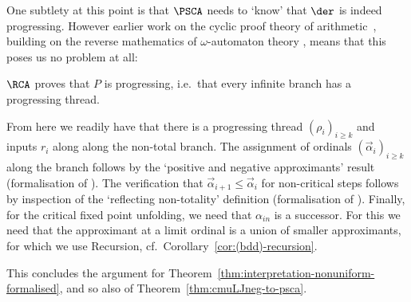 One subtlety at this point is that $\PSCA$ needs to `know' that $\der$ is indeed progressing.
However earlier work on the cyclic proof theory of arithmetic~\cite{Simpson17:cyc-arith,Das20:ca-log-comp}, building on the reverse mathematics of $\omega$-automaton theory \cite{KMPS19:buchi-rev-math}, means that this poses us no problem at all:

\begin{proposition}
    $\RCA$ proves that $P$ is progressing, i.e.\ that every infinite branch has a progressing thread.
\end{proposition}

From here we readily have that there is a progressing thread $(\rho_i)_{i\geq k}$ and inputs $r_i$ along along the non-total branch.
The assignment of ordinals $(\vec\alpha_i)_{i\geq k}$ along the branch follows by the `positive and negative approximants' result (formalisation of ).
The verification that $\vec \alpha_{i+1}\leq \vec \alpha_i$ for non-critical steps follows by inspection of the `reflecting non-totality' definition (formalisation of ).
Finally, for the critical fixed point unfolding, we need that $\alpha_{in}$ is a successor. 
For this we need that the approximant at a limit ordinal is a union of smaller approximants, for which we use Recursion, cf.~Corollary~\ref{cor:(bdd)-recursion}.

\medskip

This concludes the argument for Theorem~\ref{thm:interpretation-nonuniform-formalised}, and so also of Theorem~\ref{thm:cmuLJneg-to-psca}.